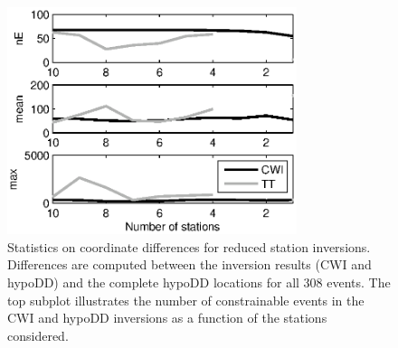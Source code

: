 \documentclass[extra]{gji}
\begin{document}
\begin{figure}
\noindent\includegraphics[width = 20pc]{diags/CalaverasLoc4_hypoDD_SVD.eps}
\caption{Statistics on coordinate differences for reduced station inversions. Differences
are computed between the inversion results (CWI and hypoDD) and the complete hypoDD
locations for all 308 events. The top subplot illustrates the number of constrainable
events in the CWI and hypoDD inversions as a function of the stations considered.}
\label{fig-statremoval_summarystats}
\end{figure}
\end{document}

